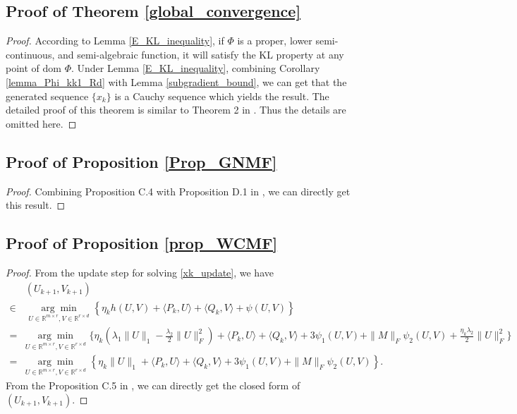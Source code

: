 \documentclass[letterpaper]{article} %
\begin{document}
	\subsection{Proof of  Theorem \ref{global_convergence}}   
	\begin{proof}
		According to Lemma \ref{E_KL_inequality}, if $\Phi$ is a proper, lower semi-continuous, and semi-algebraic function, it will satisfy the
		KL property at any point of $\text{dom }\Phi$. Under Lemma \ref{E_KL_inequality}, combining Corollary \ref{lemma_Phi_kk1_Rd} with Lemma \ref{subgradient_bound}, we can get that the generated sequence
		$\{x_{k}\}$ is a Cauchy sequence which yields the result. The detailed proof of this theorem is similar to Theorem 2 in \cite{WangH23}. Thus the details are omitted here.
	\end{proof} 
	
	\subsection{Proof of Proposition \ref{Prop_GNMF}}
	\begin{proof}
		Combining Proposition C.4 with Proposition D.1 in \cite{MukkamalaO19}, we can directly get this result. 
	\end{proof}
	
	\subsection{Proof of  Proposition \ref{prop_WCMF}}
	\begin{proof}
		From the  update step for solving \eqref{xk_update}, we have  
		\begin{align*}
			&(U_{k+1},V_{k+1})\\
			\in&\,\,\underset{U\in\mathbb{R}^{m\times r},V\in\mathbb{R}^{r\times d}}{\arg\min}\,\,\left\{\eta_{k} h(U,V)+\langle P_{k},U\rangle+\langle Q_{k},V\rangle+\psi(U,V)\right\}\\
			=&\underset{U\in\mathbb{R}^{m\times r},V\in\mathbb{R}^{r\times d}}{\arg\min}\,\,\Big\{\eta_{k}\left(\lambda_{1}\|U\|_{1}-\frac{\lambda_{2}}{2}\|U\|_{F}^{2}\right)+\langle P_{k},U\rangle+\langle Q_{k},V\rangle
			+3\psi_{1}(U,V)+\|M\|_{F}\psi_{2}(U,V)+\frac{\eta_{k}\lambda_{2}}{2}\|U\|_{F}^{2}\Big\}\\
			=&\underset{U\in\mathbb{R}^{m\times r},V\in\mathbb{R}^{r\times d}}{\arg\min}\,\,\left\{\eta_{k}\|U\|_{1}+\langle P_{k},U\rangle+\langle Q_{k},V\rangle+3\psi_{1}(U,V)+\|M\|_{F}\psi_{2}(U,V)\right\}.
		\end{align*}
		From the Proposition C.5 in \cite{MukkamalaO19}, we can directly get the closed form of $(U_{k+1},V_{k+1})$.
	\end{proof}
	
\end{document}
